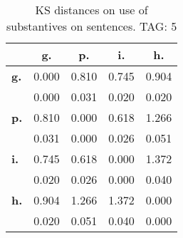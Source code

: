 \begin{table}[h!]
\begin{center}
\begin{tabular}{| l || c | c | c | c |}\hline
 & {\bf g.} & {\bf p.} & {\bf i.} & {\bf h.} \\\hline\hline
{\bf g.} & 0.000 & 0.810 & 0.745 & 0.904 \\
{\bf } & 0.000 & 0.031 & 0.020 & 0.020 \\\hline
{\bf p.} & 0.810 & 0.000 & 0.618 & 1.266 \\
{\bf } & 0.031 & 0.000 & 0.026 & 0.051 \\\hline
{\bf i.} & 0.745 & 0.618 & 0.000 & 1.372 \\
{\bf } & 0.020 & 0.026 & 0.000 & 0.040 \\\hline
{\bf h.} & 0.904 & 1.266 & 1.372 & 0.000 \\
{\bf } & 0.020 & 0.051 & 0.040 & 0.000 \\\hline
\end{tabular}
\caption{KS distances on use of substantives on sentences. TAG: 5}
\end{center}
\end{table}